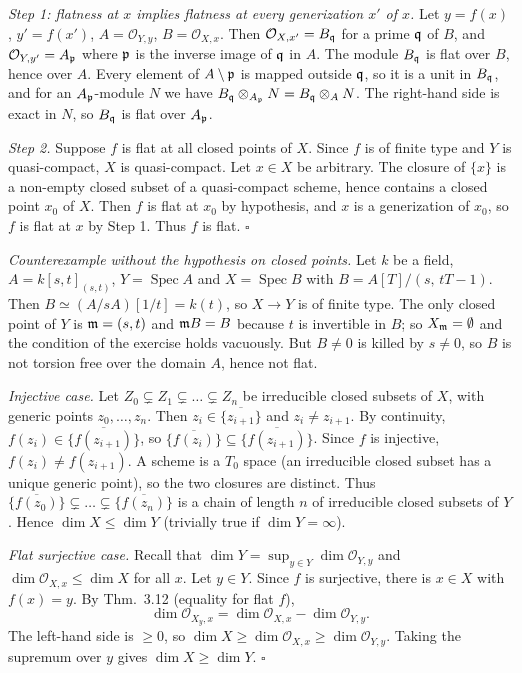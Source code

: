 \documentclass[11pt]{article}
\begin{document}
\emph{Step 1: flatness at $x$ implies flatness at every generization $x'$ of $x$.} Let $y=f(x)$, $y'=f(x')$, $A=\mathcal O_{Y,y}$, $B=\mathcal O_{X,x}$. Then $\mathcal O_{X,x'}=B_{\mathfrak q}$ for a prime $\mathfrak q$ of $B$, and $\mathcal O_{Y,y'}=A_{\mathfrak p}$ where $\mathfrak p$ is the inverse image of $\mathfrak q$ in $A$. The module $B_{\mathfrak q}$ is flat over $B$, hence over $A$. Every element of $A\setminus\mathfrak p$ is mapped outside $\mathfrak q$, so it is a unit in $B_{\mathfrak q}$, and for an $A_{\mathfrak p}$-module $N$ we have $B_{\mathfrak q}\otimes_{A_{\mathfrak p}}N=B_{\mathfrak q}\otimes_AN$. The right-hand side is exact in $N$, so $B_{\mathfrak q}$ is flat over $A_{\mathfrak p}$.

\emph{Step 2.} Suppose $f$ is flat at all closed points of $X$. Since $f$ is of finite type and $Y$ is quasi-compact, $X$ is quasi-compact. Let $x\in X$ be arbitrary. The closure of $\{x\}$ is a non-empty closed subset of a quasi-compact scheme, hence contains a closed point $x_0$ of $X$. Then $f$ is flat at $x_0$ by hypothesis, and $x$ is a generization of $x_0$, so $f$ is flat at $x$ by Step 1. Thus $f$ is flat. \hfill$\square$

\emph{Counterexample without the hypothesis on closed points.} Let $k$ be a field, $A=k[s,t]_{(s,t)}$, $Y=\operatorname{Spec}A$ and $X=\operatorname{Spec}B$ with $B=A[T]/(s,\,tT-1)$. Then $B\simeq(A/sA)[1/t]=k(t)$, so $X\to Y$ is of finite type. The only closed point of $Y$ is $\mathfrak m=(s,t)$ and $\mathfrak m B=B$ because $t$ is invertible in $B$; so $X_{\mathfrak m}=\emptyset$ and the condition of the exercise holds vacuously. But $B\neq0$ is killed by $s\neq0$, so $B$ is not torsion free over the domain $A$, hence not flat.

\pf
\emph{Injective case.} Let $Z_0\subsetneq Z_1\subsetneq\dots\subsetneq Z_n$ be irreducible closed subsets of $X$, with generic points $z_0,\dots,z_n$. Then $z_i\in\overline{\{z_{i+1}\}}$ and $z_i\neq z_{i+1}$. By continuity, $f(z_i)\in\overline{\{f(z_{i+1})\}}$, so $\overline{\{f(z_i)\}}\subseteq\overline{\{f(z_{i+1})\}}$. Since $f$ is injective, $f(z_i)\ne f(z_{i+1})$. A scheme is a $T_0$ space (an irreducible closed subset has a unique generic point), so the two closures are distinct. Thus $\overline{\{f(z_0)\}}\subsetneq\dots\subsetneq\overline{\{f(z_n)\}}$ is a chain of length $n$ of irreducible closed subsets of $Y$. Hence $\dim X\le\dim Y$ (trivially true if $\dim Y=\infty$).

\emph{Flat surjective case.} Recall that $\dim Y=\sup_{y\in Y}\dim\mathcal O_{Y,y}$ and $\dim\mathcal O_{X,x}\le\dim X$ for all $x$. Let $y\in Y$. Since $f$ is surjective, there is $x\in X$ with $f(x)=y$. By Thm.~3.12 (equality for flat $f$),
\[ \dim\mathcal O_{X_y,x}=\dim\mathcal O_{X,x}-\dim\mathcal O_{Y,y}. \]
The left-hand side is $\ge0$, so $\dim X\ge\dim\mathcal O_{X,x}\ge\dim\mathcal O_{Y,y}$. Taking the supremum over $y$ gives $\dim X\ge\dim Y$. \hfill$\square$
\end{document}
